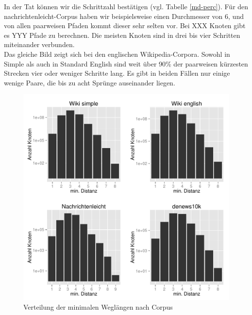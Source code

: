 \documentclass[11pt, a4paper]{article}
\begin{document}

In der Tat können wir die Schrittzahl bestätigen (vgl. Tabelle \ref{md-perc}).
Für den nachrichtenleicht-Corpus haben wir beispielsweise einen Durchmesser von
6, und von %
allen paarweisen Pfaden kommt dieser sehr selten vor. Bei XXX Knoten gibt
es YYY Pfade zu berechnen. Die meisten Knoten sind in drei bis vier Schritten
miteinander verbunden.\\
Das gleiche Bild zeigt sich bei den englischen Wikipedia-Corpora. Sowohl in 
Simple als auch in Standard English sind weit über 90\% der paarweisen
kürzesten Strecken vier oder weniger Schritte lang. Es gibt in beiden Fällen nur
einige wenige Paare, die bis zu acht Sprünge auseinander liegen.

\begin{figure}[ht]
    \centering
        \includegraphics[scale=.75]{mdh_plots.pdf}
    \caption{Verteilung der minimalen Weglängen nach Corpus}
    \label{fig-mdh}
\end{figure}
\end{document}
